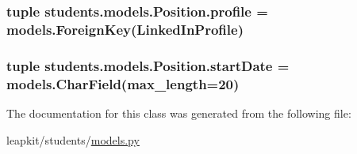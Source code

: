\hypertarget{classstudents_1_1models_1_1_position_ad2df3949444f644d538a93d7e829f9f7}{
\subsubsection[{profile}]{\setlength{\rightskip}{0pt plus 5cm}tuple students.\-models.\-Position.\-profile = models.\-Foreign\-Key({\bf Linked\-In\-Profile})\hspace{0.3cm}{\ttfamily [static]}}}\label{classstudents_1_1models_1_1_position_ad2df3949444f644d538a93d7e829f9f7}
\hypertarget{classstudents_1_1models_1_1_position_ac2b78c8bf158e58d59783e6ec2a3507f}{
\subsubsection[{start\-Date}]{\setlength{\rightskip}{0pt plus 5cm}tuple students.\-models.\-Position.\-start\-Date = models.\-Char\-Field(max\-\_\-length=20)\hspace{0.3cm}{\ttfamily [static]}}}\label{classstudents_1_1models_1_1_position_ac2b78c8bf158e58d59783e6ec2a3507f}


The documentation for this class was generated from the following file\-:\begin{DoxyCompactItemize}
\item 
leapkit/students/\hyperlink{models_8py}{models.\-py}\end{DoxyCompactItemize}
